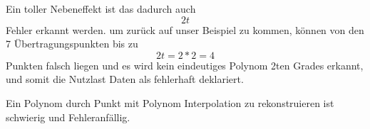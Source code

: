 Ein toller Nebeneffekt ist das dadurch auch $$2t$$ Fehler erkannt werden. 
um zurück auf unser Beispiel zu kommen, 
können von den 7 Übertragungspunkten bis zu $$2t = 2*2 = 4 $$ Punkten falsch liegen 
und es wird kein eindeutiges Polynom 2ten Grades erkannt, und somit die Nutzlast Daten als fehlerhaft deklariert.

Ein Polynom durch Punkt mit Polynom Interpolation zu rekonstruieren ist schwierig und Fehleranfällig.

